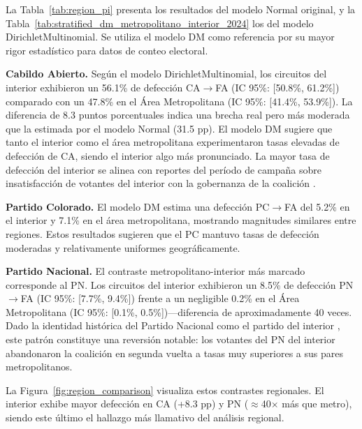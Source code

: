 La Tabla~\ref{tab:region_pi} presenta los resultados del modelo Normal original, y la Tabla~\ref{tab:stratified_dm_metropolitano_interior_2024} los del modelo DirichletMultinomial. Se utiliza el modelo DM como referencia por su mayor rigor estadístico para datos de conteo electoral.





\textbf{Cabildo Abierto.} Según el modelo DirichletMultinomial, los circuitos del interior exhibieron un 56.1\% de defección CA$\to$FA (IC 95\%: [50.8\%, 61.2\%]) comparado con un 47.8\% en el Área Metropolitana (IC 95\%: [41.4\%, 53.9\%]). La diferencia de 8.3 puntos porcentuales indica una brecha real pero más moderada que la estimada por el modelo Normal (31.5 pp). El modelo DM sugiere que tanto el interior como el área metropolitana experimentaron tasas elevadas de defección de CA, siendo el interior algo más pronunciado. La mayor tasa de defección del interior se alinea con reportes del período de campaña sobre insatisfacción de votantes del interior con la gobernanza de la coalición \citep{uruguay2024campaign}.

\textbf{Partido Colorado.} El modelo DM estima una defección PC$\to$FA del 5.2\% en el interior y 7.1\% en el área metropolitana, mostrando magnitudes similares entre regiones. Estos resultados sugieren que el PC mantuvo tasas de defección moderadas y relativamente uniformes geográficamente.

\textbf{Partido Nacional.} El contraste metropolitano-interior más marcado corresponde al PN. Los circuitos del interior exhibieron un 8.5\% de defección PN$\to$FA (IC 95\%: [7.7\%, 9.4\%]) frente a un negligible 0.2\% en el Área Metropolitana (IC 95\%: [0.1\%, 0.5\%])---diferencia de aproximadamente 40 veces. Dado la identidad histórica del Partido Nacional como el partido del interior \citep{gonzalez1993structuring}, este patrón constituye una reversión notable: los votantes del PN del interior abandonaron la coalición en segunda vuelta a tasas muy superiores a sus pares metropolitanos.

La Figura~\ref{fig:region_comparison} visualiza estos contrastes regionales. El interior exhibe mayor defección en CA (+8.3 pp) y PN ($\approx$40$\times$ más que metro), siendo este último el hallazgo más llamativo del análisis regional.

